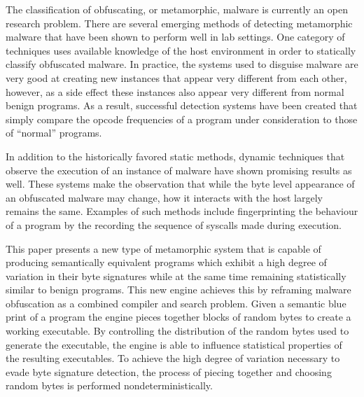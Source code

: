
    The classification of obfuscating, or metamorphic, malware is currently an
    open research problem. There are several emerging methods of detecting
    metamorphic malware that have been shown to perform well in lab settings.
    One category of techniques uses available knowledge of the host environment
    in order to statically classify obfuscated malware. In practice, the systems
    used to disguise malware are very good at creating new instances that appear
    very different from each other, however, as a side effect these instances
    also appear very different from normal benign programs. As a result,
    successful detection systems have been created that simply compare the
    opcode frequencies of a program under consideration to those of ``normal''
    programs\cite{histogram}.

    In addition to the historically favored static methods, dynamic techniques
    that observe the execution of an instance of malware have shown promising
    results as well. These systems make the observation that while the byte
    level appearance of an obfuscated malware may change, how it interacts with
    the host largely remains the same. Examples of such methods include
    fingerprinting the behaviour of a program by the recording the sequence of
    syscalls made during execution.

    
    This paper presents a new type of metamorphic system that is capable of
    producing semantically equivalent programs which exhibit a high degree of
    variation in their byte signatures while at the same time remaining
    statistically similar to benign programs. This new engine achieves this by
    reframing malware obfuscation as a combined compiler and search problem.
    Given a semantic blue print of a program the engine pieces together blocks
    of random bytes to create a working executable. By controlling the
    distribution of the random bytes used to generate the executable, the engine
    is able to influence statistical properties of the resulting executables. To
    achieve the high degree of variation necessary to evade byte signature
    detection, the process of piecing together and choosing random bytes is
    performed nondeterministically.
